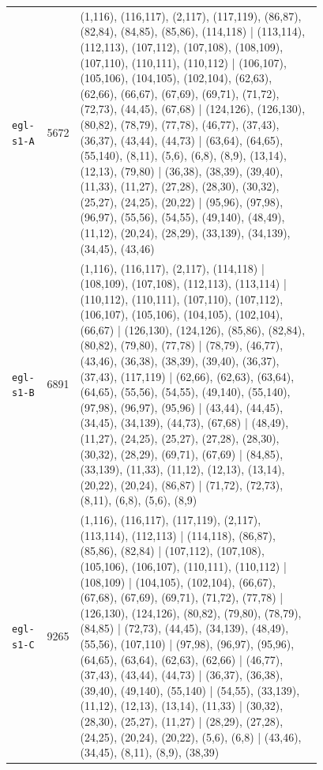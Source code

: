 \begin{landscape}
\begin{longtable}{lr>{\tiny\raggedright\arraybackslash}p{0.78\linewidth}}
\texttt{egl-s1-A} & 5672 & (1,116), (116,117), (2,117), (117,119), (86,87), (82,84), (84,85), (85,86), (114,118) | (113,114), (112,113), (107,112), (107,108), (108,109), (107,110), (110,111), (110,112) | (106,107), (105,106), (104,105), (102,104), (62,63), (62,66), (66,67), (67,69), (69,71), (71,72), (72,73), (44,45), (67,68) | (124,126), (126,130), (80,82), (78,79), (77,78), (46,77), (37,43), (36,37), (43,44), (44,73) | (63,64), (64,65), (55,140), (8,11), (5,6), (6,8), (8,9), (13,14), (12,13), (79,80) | (36,38), (38,39), (39,40), (11,33), (11,27), (27,28), (28,30), (30,32), (25,27), (24,25), (20,22) | (95,96), (97,98), (96,97), (55,56), (54,55), (49,140), (48,49), (11,12), (20,24), (28,29), (33,139), (34,139), (34,45), (43,46) \\[2pt]
\texttt{egl-s1-B} & 6891 & (1,116), (116,117), (2,117), (114,118) | (108,109), (107,108), (112,113), (113,114) | (110,112), (110,111), (107,110), (107,112), (106,107), (105,106), (104,105), (102,104), (66,67) | (126,130), (124,126), (85,86), (82,84), (80,82), (79,80), (77,78) | (78,79), (46,77), (43,46), (36,38), (38,39), (39,40), (36,37), (37,43), (117,119) | (62,66), (62,63), (63,64), (64,65), (55,56), (54,55), (49,140), (55,140), (97,98), (96,97), (95,96) | (43,44), (44,45), (34,45), (34,139), (44,73), (67,68) | (48,49), (11,27), (24,25), (25,27), (27,28), (28,30), (30,32), (28,29), (69,71), (67,69) | (84,85), (33,139), (11,33), (11,12), (12,13), (13,14), (20,22), (20,24), (86,87) | (71,72), (72,73), (8,11), (6,8), (5,6), (8,9) \\[2pt]
\texttt{egl-s1-C} & 9265 & (1,116), (116,117), (117,119), (2,117), (113,114), (112,113) | (114,118), (86,87), (85,86), (82,84) | (107,112), (107,108), (105,106), (106,107), (110,111), (110,112) | (108,109) | (104,105), (102,104), (66,67), (67,68), (67,69), (69,71), (71,72), (77,78) | (126,130), (124,126), (80,82), (79,80), (78,79), (84,85) | (72,73), (44,45), (34,139), (48,49), (55,56), (107,110) | (97,98), (96,97), (95,96), (64,65), (63,64), (62,63), (62,66) | (46,77), (37,43), (43,44), (44,73) | (36,37), (36,38), (39,40), (49,140), (55,140) | (54,55), (33,139), (11,12), (12,13), (13,14), (11,33) | (30,32), (28,30), (25,27), (11,27) | (28,29), (27,28), (24,25), (20,24), (20,22), (5,6), (6,8) | (43,46), (34,45), (8,11), (8,9), (38,39) \\[2pt]

\end{longtable}
\end{landscape}

